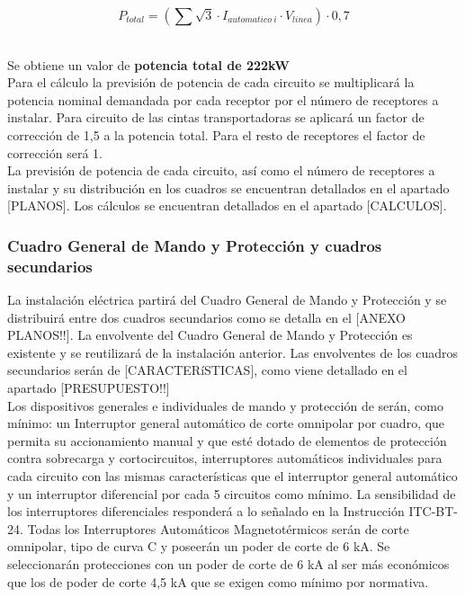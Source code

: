 $$P_{total}=\left( \sum \sqrt 3 \cdot I_{automatico\ i}\cdot  {V_{linea}}\right)\cdot 0,7$$\

Se obtiene un valor de {\bfseries potencia total de 222kW}\\

Para el cálculo la previsión de potencia de cada circuito se multiplicará la potencia nominal demandada por cada receptor por el número de receptores a instalar. Para circuito de las cintas transportadoras se aplicará un factor de corrección de 1,5 a la potencia total. Para el resto de receptores el factor de corrección será 1. \\

La previsión de potencia de cada circuito, así como el número de receptores a instalar y su distribución en los cuadros se encuentran detallados en el apartado [PLANOS]. Los cálculos se encuentran detallados en el apartado [CALCULOS]. 

\subsubsection{Cuadro General de Mando y Protección y cuadros secundarios}

La instalación eléctrica partirá del Cuadro General de Mando y Protección y se distribuirá entre dos cuadros secundarios como se detalla en el [ANEXO PLANOS!!]. La envolvente del Cuadro General de Mando y Protección es existente y se reutilizará de la instalación anterior. Las envolventes de los cuadros secundarios serán de [CARACTERíSTICAS], como viene detallado en el apartado [PRESUPUESTO!!]\\

Los dispositivos generales e individuales de mando y protección de serán, como mínimo: un Interruptor general automático de corte omnipolar por cuadro, que permita su accionamiento manual y que esté dotado de elementos de protección contra sobrecarga y cortocircuitos, interruptores automáticos individuales para cada circuito con las mismas características que el interruptor general automático y un interruptor diferencial por cada 5 circuitos como mínimo. La sensibilidad de los interruptores diferenciales responderá a lo señalado en la Instrucción ITC-BT-24. Todas los Interruptores Automáticos Magnetotérmicos serán de corte omnipolar, tipo de curva C y poseerán un poder de corte de 6 kA. Se seleccionarán protecciones con un poder de corte de 6 kA al ser más económicos que los de poder de corte 4,5 kA que se exigen como mínimo por normativa.\\

